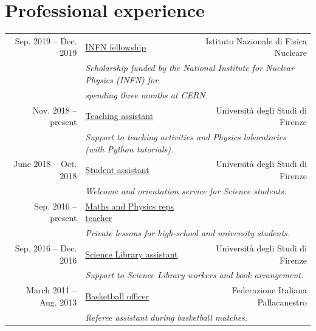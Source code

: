 \documentclass[a4, 11pt]{report}
\begin{document}
    \section*{Professional experience}
        \begin{tabular*}{\textwidth}{rl @{\extracolsep{\fill}} r}
            {\small Sep. 2019 -- Dec. 2019} & \ul{INFN fellowship} & {\small Istituto Nazionale di Fisica Nucleare}\\
            & \multicolumn{2}{l}{\small \emph {Scholarship funded by the National Institute for Nuclear Physics (INFN) for}}\\
            & \multicolumn{2}{l}{\small \emph{spending three months at CERN.}}\\ [3 mm]
        
            {\small Nov. 2018 -- present} & \ul{Teaching assistant} & {\small Università degli Studi di Firenze}\\
            & \multicolumn{2}{l}{\small \emph {Support to teaching activities and Physics laboratories (with Python tutorials).}}\\ [3 mm]
            
            {\small June 2018 -- Oct. 2018} & \ul{Student assistant} & {\small Università degli Studi di Firenze}\\
            & \multicolumn{2}{l}{\small \emph {Welcome and orientation service for Science students.}}\\ [3 mm]
            
            {\small Sep. 2016 -- present} & \underline{Maths and Physics reps teacher}\\
            & \multicolumn{2}{l}{\small \emph {Private lessons for high-school and university students.}}\\ [3 mm]
            
            {\small Sep. 2016 -- Dec. 2016} & \ul{Science Library assistant} & {\small Università degli Studi di Firenze}\\
            & \multicolumn{2}{l}{\small \emph {Support to Science Library workers and book arrangement.}}\\ [3 mm]
            
            {\small March 2011 -- Aug. 2013} & \ul{Basketball officer} & {\small Federazione Italiana Pallacanestro}\\
            & \multicolumn{2}{l}{\small \emph {Referee assistant during basketball matches.}}\\
        \end{tabular*}
    
\end{document}
